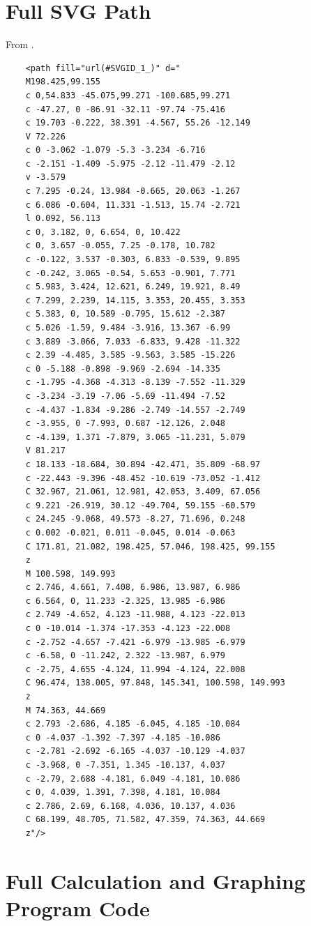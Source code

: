 \documentclass[letterpaper, 12pt]{article}
\begin{document}
\appendix

\section{Full SVG Path} \label{app:fullSVG}

From \cite{internationalbaccalaureateorganisationInternationalBaccalaureateLogo2013}.

\begin{verbatim}
    <path fill="url(#SVGID_1_)" d="
    M198.425,99.155
    c 0,54.833 -45.075,99.271 -100.685,99.271
    c -47.27, 0 -86.91 -32.11 -97.74 -75.416
    c 19.703 -0.222, 38.391 -4.567, 55.26 -12.149
    V 72.226
    c 0 -3.062 -1.079 -5.3 -3.234 -6.716
    c -2.151 -1.409 -5.975 -2.12 -11.479 -2.12
    v -3.579
    c 7.295 -0.24, 13.984 -0.665, 20.063 -1.267
    c 6.086 -0.604, 11.331 -1.513, 15.74 -2.721
    l 0.092, 56.113
    c 0, 3.182, 0, 6.654, 0, 10.422
    c 0, 3.657 -0.055, 7.25 -0.178, 10.782
    c -0.122, 3.537 -0.303, 6.833 -0.539, 9.895
    c -0.242, 3.065 -0.54, 5.653 -0.901, 7.771
    c 5.983, 3.424, 12.621, 6.249, 19.921, 8.49
    c 7.299, 2.239, 14.115, 3.353, 20.455, 3.353
    c 5.383, 0, 10.589 -0.795, 15.612 -2.387
    c 5.026 -1.59, 9.484 -3.916, 13.367 -6.99
    c 3.889 -3.066, 7.033 -6.833, 9.428 -11.322
    c 2.39 -4.485, 3.585 -9.563, 3.585 -15.226
    c 0 -5.188 -0.898 -9.969 -2.694 -14.335
    c -1.795 -4.368 -4.313 -8.139 -7.552 -11.329
    c -3.234 -3.19 -7.06 -5.69 -11.494 -7.52
    c -4.437 -1.834 -9.286 -2.749 -14.557 -2.749
    c -3.955, 0 -7.993, 0.687 -12.126, 2.048
    c -4.139, 1.371 -7.879, 3.065 -11.231, 5.079
    V 81.217
    c 18.133 -18.684, 30.894 -42.471, 35.809 -68.97
    c -22.443 -9.396 -48.452 -10.619 -73.052 -1.412
    C 32.967, 21.061, 12.981, 42.053, 3.409, 67.056
    c 9.221 -26.919, 30.12 -49.704, 59.155 -60.579
    c 24.245 -9.068, 49.573 -8.27, 71.696, 0.248
    c 0.002 -0.021, 0.011 -0.045, 0.014 -0.063
    C 171.81, 21.082, 198.425, 57.046, 198.425, 99.155
    z 
    M 100.598, 149.993
    c 2.746, 4.661, 7.408, 6.986, 13.987, 6.986
    c 6.564, 0, 11.233 -2.325, 13.985 -6.986
    c 2.749 -4.652, 4.123 -11.988, 4.123 -22.013
    c 0 -10.014 -1.374 -17.353 -4.123 -22.008
    c -2.752 -4.657 -7.421 -6.979 -13.985 -6.979
    c -6.58, 0 -11.242, 2.322 -13.987, 6.979
    c -2.75, 4.655 -4.124, 11.994 -4.124, 22.008
    C 96.474, 138.005, 97.848, 145.341, 100.598, 149.993
    z 
    M 74.363, 44.669
    c 2.793 -2.686, 4.185 -6.045, 4.185 -10.084
    c 0 -4.037 -1.392 -7.397 -4.185 -10.086
    c -2.781 -2.692 -6.165 -4.037 -10.129 -4.037
    c -3.968, 0 -7.351, 1.345 -10.137, 4.037
    c -2.79, 2.688 -4.181, 6.049 -4.181, 10.086
    c 0, 4.039, 1.391, 7.398, 4.181, 10.084
    c 2.786, 2.69, 6.168, 4.036, 10.137, 4.036
    C 68.199, 48.705, 71.582, 47.359, 74.363, 44.669
    z"/>
\end{verbatim}

\section{Full Calculation and Graphing Program Code}




\end{document}
